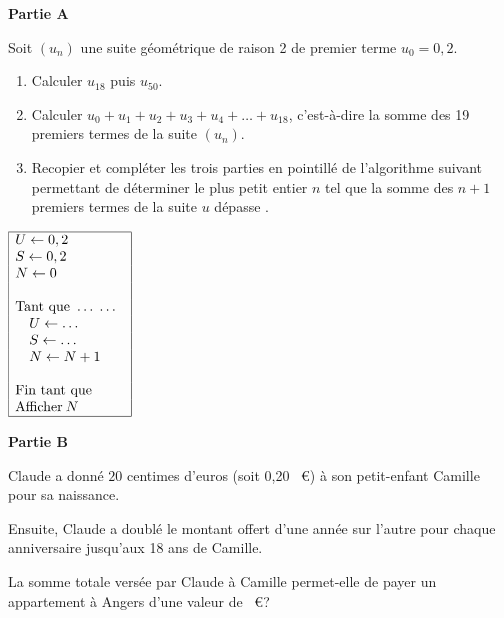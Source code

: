 \medskip

\textbf{Partie A}

\medskip 

Soit $\left(u_n\right)$ une suite géométrique de raison 2 de premier terme $u_0 = 0,2$.

\medskip

\begin{enumerate}
\item Calculer $u_{18}$ puis $u_{50}$.
\item Calculer $u_0 + u_1 + u_2 + u_3 + u_4 + \ldots + u_{18}$, c'est-à-dire la somme des 19
premiers termes de la suite $\left(u_n\right)$.
\item Recopier et compléter les trois parties en pointillé de l'algorithme suivant permettant de déterminer le plus petit entier $n$ tel que la somme des $n + 1$ premiers termes de la suite $u$ dépasse .
\end{enumerate}

\begin{center}
$\begin{array}{|l|}\hline
U \gets  0,2\\
S \gets 0,2\\
N \gets 0\\
~\\
\text{Tant que }\ldots\;\ldots\\
\quad U \gets \ldots\\
\quad S \gets \ldots\\
\quad N \gets N + 1\\
~\\
\text{Fin tant que}~~~~~~~\\
\text{Afficher}\: N\\ \hline
\end{array}$
\end{center}

\medskip

\textbf{Partie B}

\medskip

Claude a donné $20$ centimes d'euros (soit 0,20 ~\euro) à son petit-enfant Camille pour sa naissance. 

Ensuite, Claude a doublé le montant offert d'une année sur l'autre pour chaque anniversaire jusqu'aux 18 ans de Camille.

La somme totale versée par Claude à Camille permet-elle de payer un appartement à Angers d'une valeur de ~\euro ?

\bigskip
